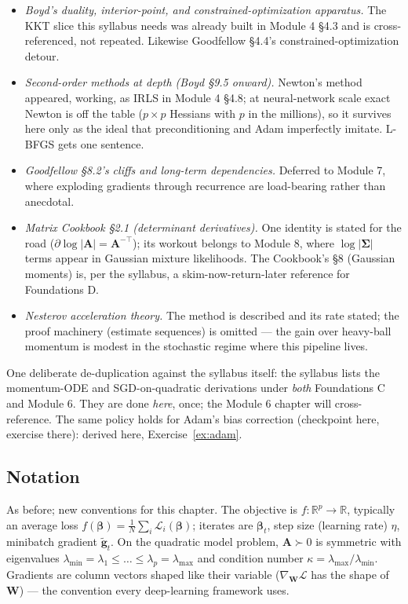 \documentclass[11pt]{article}
\numberwithin{equation}{section}
\theoremstyle{plain}
\theoremstyle{definition}
\theoremstyle{remark}
\newcounter{exercise}
\newcommand{\R}{\mathbb{R}}
\newcommand{\bbeta}{\bm{\beta}}
\newcommand{\T}{\top}
\newcommand{\lmax}{\lambda_{\max}}
\newcommand{\lmin}{\lambda_{\min}}
\begin{document}
\begin{itemize}[leftmargin=2em,itemsep=0.15em]
\item \emph{Boyd's duality, interior-point, and constrained-optimization apparatus.} The KKT slice this syllabus needs was already built in Module 4 \S4.3 and is cross-referenced, not repeated. Likewise Goodfellow \S4.4's constrained-optimization detour.
\item \emph{Second-order methods at depth (Boyd \S9.5 onward).} Newton's method appeared, working, as IRLS in Module 4 \S4.8; at neural-network scale exact Newton is off the table ($p \times p$ Hessians with $p$ in the millions), so it survives here only as the ideal that preconditioning and Adam imperfectly imitate. L-BFGS gets one sentence.
\item \emph{Goodfellow \S8.2's cliffs and long-term dependencies.} Deferred to Module 7, where exploding gradients through recurrence are load-bearing rather than anecdotal.
\item \emph{Matrix Cookbook \S2.1 (determinant derivatives).} One identity is stated for the road ($\partial \log|\bm{A}| = \bm{A}^{-\T}$); its workout belongs to Module 8, where $\log|\bm\Sigma|$ terms appear in Gaussian mixture likelihoods. The Cookbook's \S8 (Gaussian moments) is, per the syllabus, a skim-now-return-later reference for Foundations D.
\item \emph{Nesterov acceleration theory.} The method is described and its rate stated; the proof machinery (estimate sequences) is omitted --- the gain over heavy-ball momentum is modest in the stochastic regime where this pipeline lives.
\end{itemize}

One deliberate de-duplication against the syllabus itself: the syllabus lists the momentum-ODE and SGD-on-quadratic derivations under \emph{both} Foundations C and Module 6. They are done \emph{here}, once; the Module 6 chapter will cross-reference. The same policy holds for Adam's bias correction (checkpoint here, exercise there): derived here, Exercise~\ref{ex:adam}.

\subsection*{Notation}

As before; new conventions for this chapter. The objective is $f: \R^p \to \R$, typically an average loss $f(\bbeta) = \tfrac1N \sum_i \mathcal{L}_i(\bbeta)$; iterates are $\bbeta_t$, step size (learning rate) $\eta$, minibatch gradient $\tilde{\bm g}_t$. On the quadratic model problem, $\bm{A} \succ 0$ is symmetric with eigenvalues $\lmin = \lambda_1 \le \dots \le \lambda_p = \lmax$ and condition number $\kappa = \lmax/\lmin$. Gradients are column vectors shaped like their variable ($\nabla_{\bm W} \mathcal{L}$ has the shape of $\bm W$) --- the convention every deep-learning framework uses.
\end{document}
